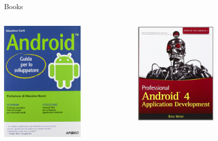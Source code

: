 \documentclass[xcolor=svgnames,11pt]{beamer}
\begin{document}
\begin{frame}[fragile]{Books}

\begin{columns}
    \begin{column}{0.5\textwidth}
    \begin{center}
    \includegraphics[width=4cm]{carli.jpg}
    \end{center}
	\end{column}
	\begin{column}{0.5\textwidth}
	\begin{center}
    \includegraphics[width=4cm]{meier.jpg}
    \end{center}
	\end{column}
\end{columns}
\end{frame}
\end{document}
